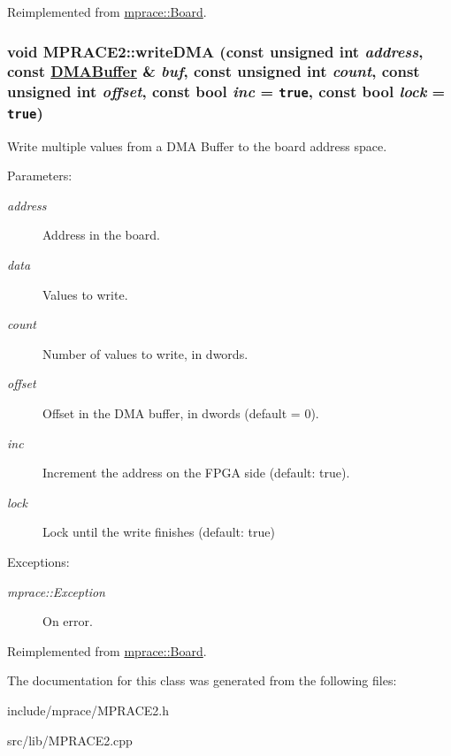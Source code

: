 Reimplemented from \hyperlink{classmprace_1_1Board_a5}{mprace::Board}.\hypertarget{classmprace_1_1MPRACE2_a6}{
\subsubsection[writeDMA]{\setlength{\rightskip}{0pt plus 5cm}void MPRACE2::write\-DMA (const unsigned int {\em address}, const \hyperlink{classmprace_1_1DMABuffer}{DMABuffer} \& {\em buf}, const unsigned int {\em count}, const unsigned int {\em offset}, const bool {\em inc} = {\tt true}, const bool {\em lock} = {\tt true})}}
\label{classmprace_1_1MPRACE2_a6}


Write multiple values from a DMA Buffer to the board address space. 

\begin{Desc}
\item[Parameters:]
\begin{description}
\item[{\em address}]Address in the board. \item[{\em data}]Values to write. \item[{\em count}]Number of values to write, in dwords. \item[{\em offset}]Offset in the DMA buffer, in dwords (default = 0). \item[{\em inc}]Increment the address on the FPGA side (default: true). \item[{\em lock}]Lock until the write finishes (default: true) \end{description}
\end{Desc}
\begin{Desc}
\item[Exceptions:]
\begin{description}
\item[{\em mprace::Exception}]On error.\end{description}
\end{Desc}


Reimplemented from \hyperlink{classmprace_1_1Board_a7}{mprace::Board}.

The documentation for this class was generated from the following files:\begin{CompactItemize}
\item 
include/mprace/MPRACE2.h\item 
src/lib/MPRACE2.cpp\end{CompactItemize}
